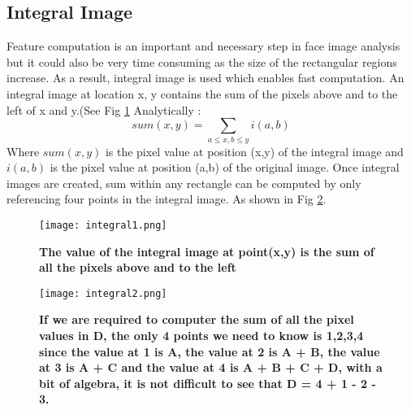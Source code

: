 \subsection{Integral Image}
\label{sec:integralimage}
Feature computation is an important and necessary step in face image analysis but it could also be very time consuming as the size of the rectangular regions increase. As a result, integral image is used which enables fast computation. An integral image at location x, y contains the sum of the pixels above and to the left of x and y.(See Fig \ref{fig:integral1} \cite{integralimage} Analytically : 
\begin{equation}
sum(x,y)= \sum\limits_{a\leq x,b\leq y}i(a,b)
\end{equation}
Where $sum(x,y)$ is the pixel value at position (x,y) of the integral image and $i(a,b)$ is the pixel value at position (a,b) of the original image. Once integral images are created, sum within any rectangle can be computed by only referencing four points in the integral image. As shown in Fig \ref{fig:integral2}.

\begin{figure}
	\centering
	\texttt{[image: integral1.png]}
	\caption[Integral image]{\label{fig:integral1}}  \textbf{The value of the integral image at point(x,y) is the sum of all the pixels above and to the left  } \cite{integralimage}
\end{figure}

\begin{figure}
	\centering
	\texttt{[image: integral2.png]}
	\caption[Integral image referencing]{\label{fig:integral2}}  \textbf{If we are required to computer the sum of all the pixel values in D, the only 4 points we need to know is 1,2,3,4 since the value at 1 is A, the value at 2 is A + B, the value at 3 is A + C and the value at 4 is A + B + C + D, with a bit of algebra, it is not difficult to see that D = 4 + 1 - 2 - 3. }\cite{integralimage} 
\end{figure}

\newpage
\thispagestyle{plain}
\mbox{}


